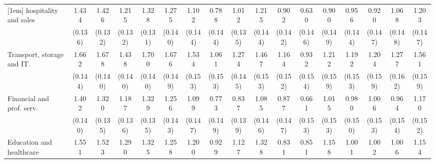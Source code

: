 {\begin{tabular}{l*{16}{c}}
[1em]
hospitality and sales&       1.434\sym{***}&       1.426\sym{***}&       1.215\sym{***}&       1.328\sym{***}&       1.275\sym{***}&       1.102\sym{***}&       0.788\sym{***}&       1.012\sym{***}&       1.215\sym{***}&       0.902\sym{***}&       0.630\sym{***}&       0.900\sym{***}&       0.956\sym{***}&       0.920\sym{***}&       1.068\sym{***}&       1.203\sym{***}\\
                    &     (0.136)         &     (0.132)         &     (0.132)         &     (0.131)         &     (0.140)         &     (0.144)         &     (0.144)         &     (0.135)         &     (0.144)         &     (0.142)         &     (0.146)         &     (0.149)         &     (0.144)         &     (0.147)         &     (0.148)         &     (0.147)         \\
[1em]
Transport, storage and IT.&       1.662\sym{***}&       1.678\sym{***}&       1.438\sym{***}&       1.700\sym{***}&       1.676\sym{***}&       1.534\sym{***}&       1.061\sym{***}&       1.274\sym{***}&       1.467\sym{***}&       1.164\sym{***}&       0.932\sym{***}&       1.212\sym{***}&       1.192\sym{***}&       1.204\sym{***}&       1.277\sym{***}&       1.561\sym{***}\\
                    &     (0.144)         &     (0.140)         &     (0.140)         &     (0.140)         &     (0.149)         &     (0.153)         &     (0.153)         &     (0.145)         &     (0.153)         &     (0.152)         &     (0.154)         &     (0.159)         &     (0.153)         &     (0.159)         &     (0.162)         &     (0.159)         \\
[1em]
Financial and prof. serv.&       1.402\sym{***}&       1.320\sym{***}&       1.187\sym{***}&       1.329\sym{***}&       1.256\sym{***}&       1.099\sym{***}&       0.773\sym{***}&       0.837\sym{***}&       1.085\sym{***}&       0.877\sym{***}&       0.661\sym{***}&       1.015\sym{***}&       0.980\sym{***}&       1.006\sym{***}&       0.964\sym{***}&       1.170\sym{***}\\
                    &     (0.140)         &     (0.135)         &     (0.136)         &     (0.135)         &     (0.143)         &     (0.147)         &     (0.149)         &     (0.139)         &     (0.146)         &     (0.147)         &     (0.153)         &     (0.153)         &     (0.150)         &     (0.153)         &     (0.154)         &     (0.152)         \\
[1em]
Education and healthcare&       1.551\sym{***}&       1.523\sym{***}&       1.290\sym{***}&       1.325\sym{***}&       1.258\sym{***}&       1.200\sym{***}&       0.929\sym{***}&       1.127\sym{***}&       1.328\sym{***}&       0.831\sym{***}&       0.851\sym{***}&       1.158\sym{***}&       1.001\sym{***}&       1.002\sym{***}&       1.006\sym{***}&       1.154\sym{***}\\

\end{tabular}}
